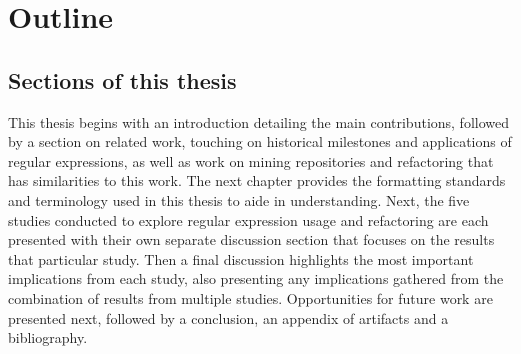 \section{Outline}

\subsection{Sections of this thesis}
This thesis begins with an introduction detailing the main contributions, followed by a section on related work, touching on historical milestones and applications of regular expressions, as well as work on mining repositories and refactoring that has similarities to this work. The next chapter provides the formatting standards and terminology used in this thesis to aide in understanding.  Next, the five studies conducted to explore regular expression usage and refactoring are each presented with their own separate discussion section that focuses on the results that particular study.  Then a final discussion highlights the most important implications from each study, also presenting any implications gathered from the combination of results from multiple studies. Opportunities for future work are presented next, followed by a conclusion, an appendix of artifacts and a bibliography.
